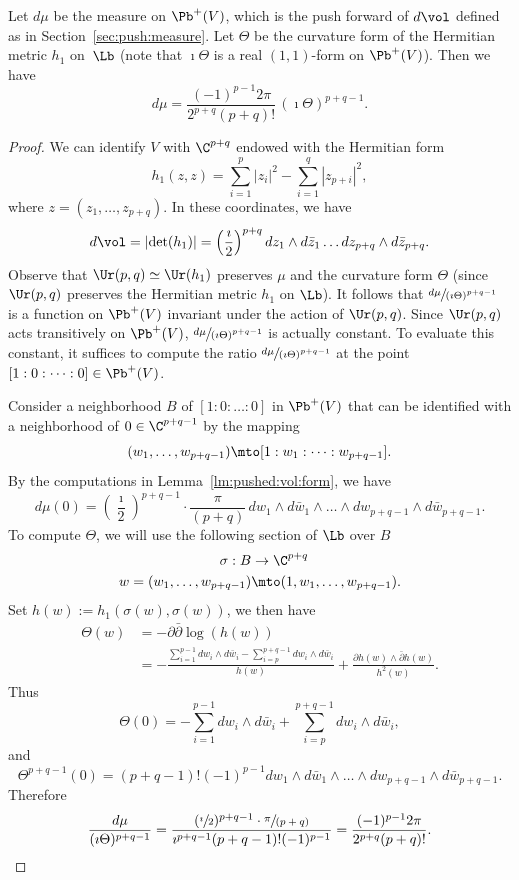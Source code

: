 \begin{Lemma}\label{lm:vol:form:chern:curv}
Let $d\mu$ be the measure on $\Pb^+(V)$, which is the push forward of $d\vol$ defined as in Section~\ref{sec:push:measure}.
Let $\Theta$ be the curvature form of the Hermitian metric $h_1$ on~$\Lb$ (note that $\imath\Theta$ is a real $(1,1)$-form on $\Pb^+(V)$).
Then we have
\[
d\mu=\frac{(-1)^{p-1}2\pi}{2^{p+q}(p+q)!}\,(\imath\Theta)^{p+q-1}.
\]
\end{Lemma}
\begin{proof}
We can identify $V$ with $\C^{p+q}$ endowed with the Hermitian form
\[
h_1(z,z)=\sum_{i=1}^p |z_i|^2-\sum_{i=1}^q |z_{p+i}|^2,
\]
where $z=(z_1,\dots,z_{p+q})$. In these coordinates, we have
\[
d\vol=|{\det}(h_1)|=\left(\frac{\imath}{2}\right)^{p+q}dz_1\wedge d\bar{z}_1\dots dz_{p+q}\wedge d\bar{z}_{p+q}.
\]
Observe that $\Ur(p,q)\simeq \Ur(h_1)$ preserves $\mu$ and the curvature form $\Theta$ (since $\Ur(p,q)$ preserves the Hermitian metric $h_1$ on $\Lb$).
It follows that $\sfrac{d\mu}{(\imath\Theta)^{p+q-1}}$ is a function on $\Pb^+(V)$ invariant under the action of $\Ur(p,q)$.
Since $\Ur(p,q)$ acts transitively on $\Pb^+(V)$, $\sfrac{d\mu}{(\imath\Theta)^{p+q-1}}$ is actually constant.
To evaluate this constant, it suffices to compute the ratio $\sfrac{d\mu}{(\imath\Theta)^{p+q-1}}$ at the point $[1:0:\dots:0] \in \Pb^+(V)$.

Consider a neighborhood $B$ of $[1:0:\dots:0]$ in $\Pb^+(V)$ that can be identified with a neighborhood of $0\in \C^{p+q-1}$ by the mapping
\[
(w_1,\dots,w_{p+q-1}) \mto [1:w_1:\dots:w_{p+q-1}].
\]
By the computations in Lemma~\ref{lm:pushed:vol:form}, we have
\[
d\mu(0)=\left(\frac{\imath}{2}\right)^{p+q-1}\cdot\frac{\pi}{(p+q)}\,dw_1\wedge d\bar{w}_1\wedge\dots\wedge dw_{p+q-1}\wedge d\bar{w}_{p+q-1}.
\]
To compute $\Theta$, we will use the following section of $\Lb$ over $B$
\begin{align*}
\sigma: B & \to  \C^{p+q} \\
 w=(w_1,\dots,w_{p+q-1}) & \mto  (1,w_1,\dots,w_{p+q-1}).
\end{align*}
Set $h(w):=h_1(\sigma(w),\sigma(w))$, we then have
\begin{align*}
\Theta(w) &=  -\partial\bar{\partial}\log(h(w)) \\
& = -\frac{\sum_{i=1}^{p-1}dw_i\wedge d\bar{w}_i-\sum_{i=p}^{p+q-1}dw_i\wedge d\bar{w}_i}{h(w)} + \frac{\partial h(w)\wedge\bar{\partial}h(w)}{h^2(w)}.
\end{align*}
Thus
\[
\Theta(0)=-\sum_{i=1}^{p-1}dw_i\wedge d\bar{w}_i+\sum_{i=p}^{p+q-1}dw_i \wedge d\bar{w}_i,
\]
and
\[
\Theta^{p+q-1}(0)=(p+q-1)!(-1)^{p-1}dw_1\wedge d\bar{w}_1\wedge\dots\wedge dw_{p+q-1}\wedge d\bar{w}_{p+q-1}.
\]
Therefore
\[
\frac{d\mu}{(\imath\Theta)^{p+q-1}}= \frac{(\sfrac{\imath}{2})^{p+q-1}\cdot\sfrac{\pi}{(p+q)}}{\imath^{p+q-1} (p+q-1)!(-1)^{p-1}} = \frac{(-1)^{p-1}2\pi}{2^{p+q}(p+q)!}.\qedhere
\]
\end{proof}

